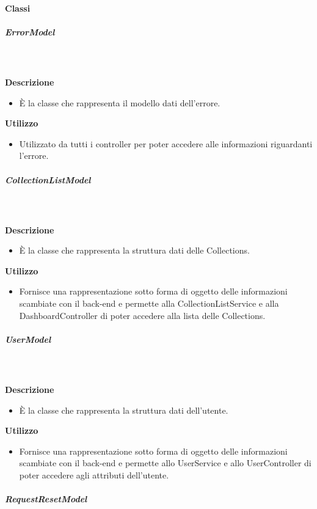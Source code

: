     \paragraph{Classi}
      \subparagraph{ErrorModel}
        
        \textbf{\\ \\ Descrizione} 
          \begin{itemize}
            \item[] È la classe che rappresenta il modello dati dell'errore.
          \end{itemize}      
        \textbf{Utilizzo}  
          \begin{itemize}
            \item[] Utilizzato da tutti i controller per poter accedere alle informazioni riguardanti l'errore.
          \end{itemize}
      \subparagraph{CollectionListModel}
        
        \textbf{\\ \\ Descrizione} 
          \begin{itemize}
            \item[] È la classe che rappresenta la struttura dati delle Collections.
          \end{itemize}      
        \textbf{Utilizzo}  
          \begin{itemize}
            \item[] Fornisce una rappresentazione sotto forma di oggetto delle informazioni scambiate con il back-end e permette alla CollectionListService e alla DashboardController di poter accedere alla lista delle Collections.
          \end{itemize}
      \subparagraph{UserModel}
        
        \textbf{\\ \\ Descrizione} 
          \begin{itemize}
            \item[] È la classe che rappresenta la struttura dati dell'utente.
          \end{itemize}      
        \textbf{Utilizzo}  
          \begin{itemize}
            \item[] Fornisce una rappresentazione sotto forma di oggetto delle informazioni scambiate con il back-end e permette allo UserService e allo UserController di poter accedere agli attributi dell'utente.
          \end{itemize}
      \subparagraph{RequestResetModel}
        

